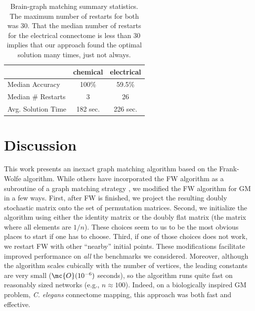 \documentclass[10pt,journal,cspaper,compsoc]{IEEEtran}
\begin{document}
\begin{table}
\caption{Brain-graph matching summary statistics.  The maximum number of restarts for both was 30.  That the median number of restarts for the electrical connectome is less than 30 implies that our approach found the optimal solution many times, just not always.}
	\label{tab:1}
\begin{center}
\begin{tabular}{|l|c|c|}
\hline	 					& chemical 		& electrical  \\ \hline
	Median Accuracy    &       100\%            &             59.5\% \\
	Median \# Restarts  &         3            &                   26 \\
	Avg. Solution Time     &      182 sec.      &                226 sec. \\ \hline
\end{tabular} 
\end{center}
\end{table}

 





\section{Discussion}

This work presents an inexact graph matching algorithm based on the Frank-Wolfe algorithm.  While others have incorporated the FW algorithm as a subroutine of a graph matching strategy \cite{Zaslavskiy2009}, we modified the FW algorithm for GM in a few ways.  First, after FW is finished, we project the resulting doubly stochastic matrix onto the set of permutation matrices.  Second, we initialize the algorithm using either the identity matrix or the doubly flat matrix (the matrix where all elements are $1/n$).  These choices seem to us to be the most obvious places to start if one has to choose.  Third, if one of those choices does not work, we restart FW with other ``nearby'' initial points.  These modifications facilitate improved performance on \emph{all} the benchmarks we considered.  Moreover, although the algorithm scales cubically with the number of vertices, the leading constants are very small ($\mc{O}(10^{-6})$ seconds), so the algorithm runs quite fast on reasonably sized networks (e.g., $n \approx 100$).  Indeed, on a biologically inspired GM problem, \emph{C. elegans} connectome mapping, this approach was both fast and effective.  
\end{document}
